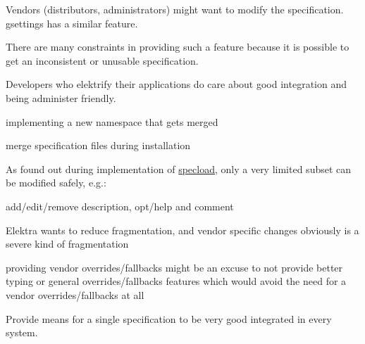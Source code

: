 Vendors (distributors, administrators) might want to modify the specification. gsettings has a similar feature.

There are many constraints in providing such a feature because it is possible to get an inconsistent or unusable specification.

Developers who elektrify their applications do care about good integration and being administer friendly.


\begin{DoxyItemize}
\item implementing a new namespace that gets merged
\item merge specification files during installation
\end{DoxyItemize}

As found out during implementation of \hyperlink{autotoc_md625_src_plugins_specload_README_md}{specload}, only a very limited subset can be modified safely, e.\+g.\+:


\begin{DoxyItemize}
\item add/edit/remove {\ttfamily description}, {\ttfamily opt/help} and {\ttfamily comment}
\end{DoxyItemize}


\begin{DoxyItemize}
\item Elektra wants to reduce fragmentation, and vendor specific changes obviously is a severe kind of fragmentation
\item providing vendor overrides/fallbacks might be an excuse to not provide better typing or general overrides/fallbacks features which would avoid the need for a vendor overrides/fallbacks at all
\end{DoxyItemize}

Provide means for a single specification to be very good integrated in every system.